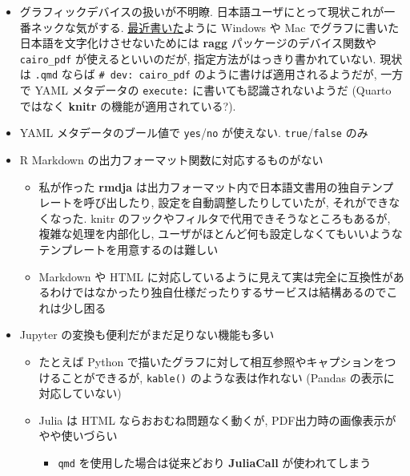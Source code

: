 \documentclass[
  letterpaper,
  DIV=11,
  pandoc,
  ja=standard,
  jafont=noto-otf]{bxjsarticle}
\providecommand{\tightlist}{%
  \setlength{\itemsep}{0pt}\setlength{\parskip}{0pt}}
\begin{document}
\begin{itemize}
\tightlist
\item
  グラフィックデバイスの扱いが不明瞭.
  日本語ユーザにとって現状これが一番ネックな気がする.
  \href{https://ill-identified.hatenablog.com/entry/2021/09/10/231230}{最近書いた}ように
  Windows や Mac でグラフに書いた日本語を文字化けさせないためには
  \textbf{ragg} パッケージのデバイス関数や \texttt{cairo\_pdf}
  が使えるといいのだが, 指定方法がはっきり書かれていない. 現状は
  \texttt{.qmd} ならば \texttt{\#\textbar{}\ dev:\ cairo\_pdf}
  のように書けば適用されるようだが, 一方で YAML メタデータの
  \texttt{execute:} に書いても認識されないようだ (Quarto ではなく
  \textbf{knitr} の機能が適用されている?).
\item
  YAML メタデータのブール値で \texttt{yes}/\texttt{no} が使えない.
  \texttt{true}/\texttt{false} のみ
\item
  R Markdown の出力フォーマット関数に対応するものがない

  \begin{itemize}
  \tightlist
  \item
    私が作った \textbf{rmdja}
    は出力フォーマット内で日本語文書用の独自テンプレートを呼び出したり,
    設定を自動調整したりしていたが, それができなくなった. knitr
    のフックやフィルタで代用できそうなところもあるが,
    複雑な処理を内部化し,
    ユーザがほとんど何も設定しなくてもいいようなテンプレートを用意するのは難しい
  \item
    Markdown や HTML
    に対応しているように見えて実は完全に互換性があるわけではなかったり独自仕様だったりするサービスは結構あるのでこれは少し困る
  \end{itemize}
\item
  Jupyter の変換も便利だがまだ足りない機能も多い

  \begin{itemize}
  \tightlist
  \item
    たとえば Python
    で描いたグラフに対して相互参照やキャプションをつけることができるが,
    \texttt{kable()} のような表は作れない (Pandas
    の表示に対応していない)
  \item
    Julia は HTML ならおおむね問題なく動くが,
    PDF出力時の画像表示がやや使いづらい

    \begin{itemize}
    \tightlist
    \item
      \texttt{qmd} を使用した場合は従来どおり \textbf{JuliaCall}
      が使われてしまう
    \end{itemize}
  \end{itemize}
\end{itemize}
\end{document}
